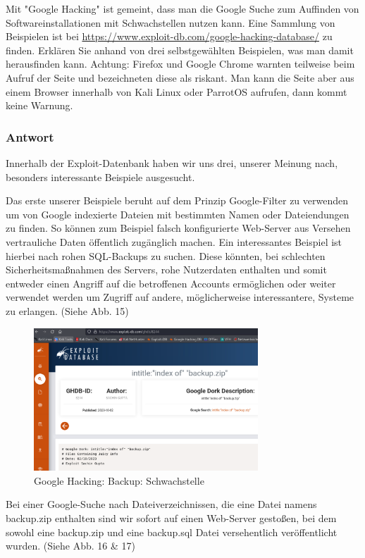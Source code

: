 \documentclass{article}
\begin{document}
Mit "Google Hacking" ist gemeint, dass man die Google Suche zum Auffinden von
Softwareinstallationen mit Schwachstellen nutzen kann. Eine Sammlung von Beispielen ist 
bei \url{https://www.exploit-db.com/google-hacking-database/} zu finden. Erklären Sie 
anhand von drei selbstgewählten Beispielen, was man damit herausfinden kann.
Achtung: Firefox und Google Chrome warnten teilweise beim Aufruf der Seite und bezeichneten diese als riskant. Man kann die Seite aber aus einem Browser innerhalb von Kali Linux oder ParrotOS aufrufen, dann kommt keine Warnung.

\subsubsection*{Antwort}

Innerhalb der Exploit-Datenbank haben wir uns drei, unserer Meinung nach, besonders 
interessante Beispiele ausgesucht.

Das erste unserer Beispiele beruht auf dem Prinzip Google-Filter zu verwenden um von 
Google indexierte Dateien mit bestimmten Namen oder Dateiendungen zu finden. So können zum 
Beispiel falsch konfigurierte Web-Server aus Versehen vertrauliche Daten öffentlich 
zugänglich machen. Ein interessantes Beispiel ist hierbei nach rohen SQL-Backups zu 
suchen. Diese könnten, bei schlechten Sicherheitsmaßnahmen des Servers, rohe Nutzerdaten 
enthalten und somit entweder einen Angriff auf die betroffenen Accounts ermöglichen oder 
weiter verwendet werden um Zugriff auf andere, möglicherweise interessantere, Systeme zu 
erlangen. (Siehe Abb. 15)

\begin{figure}[H]
	\includegraphics[width=0.75\textwidth]{images/15}
	\centering
	\caption{Google Hacking: Backup: Schwachstelle}
\end{figure}

Bei einer Google-Suche nach Dateiverzeichnissen, die eine Datei namens backup.zip enthalten
sind wir sofort auf einen Web-Server gestoßen, bei dem sowohl eine backup.zip und eine backup.sql
Datei versehentlich veröffentlicht wurden. (Siehe Abb. 16 \& 17)
\end{document}
